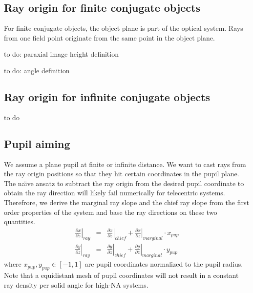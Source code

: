 \documentclass[12pt,a4paper,twoside,openright,BCOR10mm,headsepline,titlepage,abstracton,chapterprefix,final]{scrreprt}
\begin{document}
\subsection{Ray origin for finite conjugate objects}
For finite conjugate objects, the object plane is part of the optical system. Rays from one field point originate from the same point in the object plane.

to do: paraxial image height definition

to do: angle definition


\subsection{Ray origin for infinite conjugate objects}
to do

\subsection{Pupil aiming}
We assume a plane pupil at finite or infinite distance. We want to cast rays from the ray origin positions so that they hit certain coordinates in the pupil plane. 
The na\"{\i}ve ansatz to subtract the ray origin from the desired pupil coordinate to obtain the ray direction will likely fail numerically for telecentric systems.
Therefrore, we derive the marginal ray slope and the chief ray slope from the first order properties of the system and base the ray directions on these two quantities.
%
\begin{eqnarray}
  \left. \frac{\partial x}{\partial z}\right|_{ray} &=& \left. \frac{\partial x}{\partial z}\right|_{chief} + \left. \frac{\partial x}{\partial z}\right|_{marginal} \cdot x_{pup} \\
  \left. \frac{\partial y}{\partial z}\right|_{ray} &=& \left. \frac{\partial y}{\partial z}\right|_{chief} + \left. \frac{\partial y}{\partial z}\right|_{marginal} \cdot y_{pup}
\end{eqnarray}
where $x_{pup}, y_{pup} \in [-1,1]$ are pupil coordinates normalized to the pupil radius. 
Note that a equidistant mesh of pupil coordinates will not result in a constant ray density per solid angle for high-NA systems.
\end{document}
